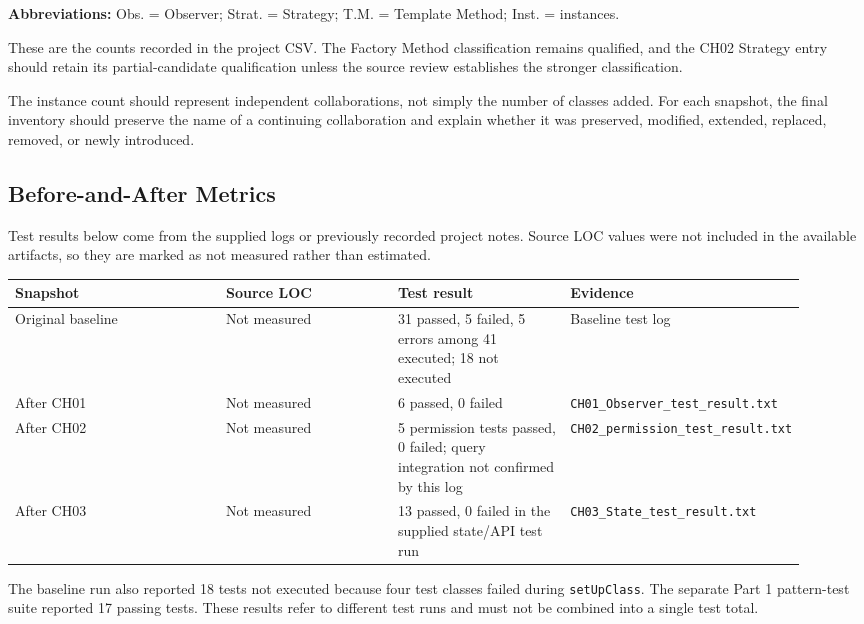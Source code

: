 \documentclass[11pt,a4paper]{article}
\newcommand{\code}[1]{\texttt{#1}}
\begin{document}
\textbf{Abbreviations:} Obs. = Observer; Strat. = Strategy;
T.M. = Template Method; Inst. = instances.

These are the counts recorded in the project CSV. The
Factory Method classification remains qualified, and the
CH02 Strategy entry should retain its partial-candidate
qualification unless the source review establishes the
stronger classification.

The instance count should represent independent
collaborations, not simply the number of classes added.
For each snapshot, the final inventory should preserve the
name of a continuing collaboration and explain whether
it was preserved, modified, extended, replaced, removed,
or newly introduced.

\subsection{Before-and-After Metrics}

Test results below come from the supplied logs or previously recorded
project notes. Source LOC values were not included in the available
artifacts, so they are marked as not measured rather than estimated.

\begin{longtable}{@{}p{0.27\linewidth}p{0.22\linewidth}p{0.22\linewidth}p{0.21\linewidth}@{}}
\toprule
Snapshot & Source LOC & Test result & Evidence\\
\midrule
Original baseline &
Not measured &
31 passed, 5 failed, 5 errors among 41 executed; 18 not executed &
Baseline test log\\

After CH01 &
Not measured &
6 passed, 0 failed &
\code{CH01\_Observer\_test\_result.txt}\\

After CH02 &
Not measured &
5 permission tests passed, 0 failed; query integration not confirmed by this log &
\code{CH02\_permission\_test\_result.txt}\\

After CH03 &
Not measured &
13 passed, 0 failed in the supplied state/API test run &
\code{CH03\_State\_test\_result.txt}\\
\bottomrule
\end{longtable}

The baseline run also reported 18 tests not executed because
four test classes failed during \code{setUpClass}. The
separate Part 1 pattern-test suite reported 17 passing tests.
These results refer to different test runs and must not be
combined into a single test total.
\end{document}
